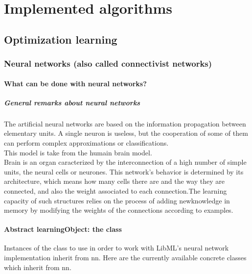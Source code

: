 \part{Implemented algorithms}
\label{algorithms:part}
\chapter{Optimization learning}
\section{Neural networks (also called connectivist networks)}
\label{algorithms:nn}

\subsection{What can be done with neural networks?}
\subsubsection{General remarks about neural networks}
The artificial neural networks are based on the information propagation
between elementary units. A single neuron is useless, but the cooperation
of some of them can perform complex approximations or classifications.\\
This model is take from the humain brain model.\\
Brain is an organ caracterized by the interconnection of a high number of
simple units, the neural cells or neurones. This network's behavior is
determined by its architecture, which means how many cells there are and
the way they are connected, and also the weight associated to each 
connection.The learning capacity of such structures relies on the process of
adding newknowledge in memory by modifying the weights of the connections 
according to examples.

\subsection{Abstract learningObject: the  class}

Instances of the  class to use in order to work with 
LibML's neural network implementation inherit from nn. Here are the currently 
available concrete classes which inherit from nn.

